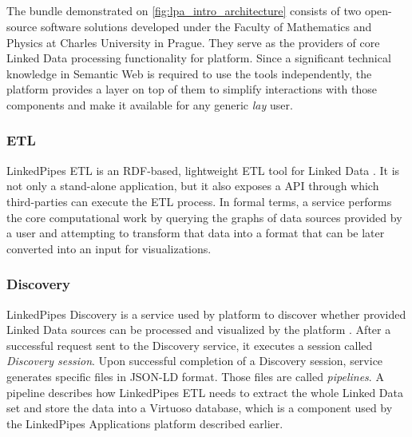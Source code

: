 \subsection{\lps{}} 
\label{ssssec:linkedpipes_services}

The \lps{} bundle demonstrated on \autoref{fig:lpa_intro_architecture} consists of two open-source software solutions developed under the Faculty of Mathematics and Physics at Charles University in Prague. They serve as the providers of core Linked Data processing functionality for \lpa{} platform. Since a significant technical knowledge in Semantic Web is required to use the tools independently, the \lpa{} platform provides a layer on top of them to simplify interactions with those components and make it available for any generic \textit{lay} user. 

\subsubsection{ETL} 

LinkedPipes ETL is an RDF-based, lightweight \gls{ETL} tool for Linked Data \cite{etl}. It is not only a stand-alone application, but it also exposes a \acrshort{API} through which third-parties can execute the ETL process. In formal terms, a service performs the core computational work by querying the graphs of data sources provided by a user and attempting to transform that data into a format that can be later converted into an input for visualizations. 

\subsubsection{Discovery} 

LinkedPipes Discovery is a service used by \lpa{} platform to discover whether provided Linked Data sources can be processed and visualized by the platform \cite{discovery}. After a successful request sent to the Discovery service, it executes a session called \textit{Discovery session}. Upon successful completion of a Discovery session, service generates specific files in JSON-LD format. Those files are called \textit{pipelines}. A pipeline describes how LinkedPipes ETL needs to extract the whole Linked Data set and store the data into a Virtuoso database, which is a component used by the LinkedPipes Applications platform described earlier. 